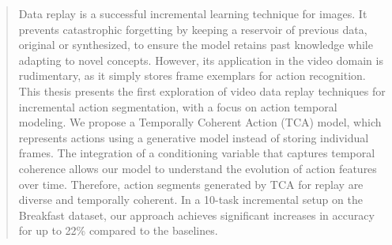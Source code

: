 \begin{abstract}

Data replay is a successful incremental learning technique for images. It prevents catastrophic forgetting by keeping a reservoir of previous data, original or synthesized, to ensure the model retains past knowledge while adapting to novel concepts. However, its application in the video domain is rudimentary, as it simply stores frame exemplars for action recognition. This thesis presents the first exploration of video data replay techniques for incremental action segmentation, with a focus on action temporal modeling. We propose a Temporally Coherent Action (TCA) model, which represents actions using a generative model instead of storing individual frames. The integration of a conditioning variable that captures temporal coherence allows our model to understand the evolution of action features over time. Therefore, action segments generated by TCA for replay are diverse and temporally coherent. In a 10-task incremental setup on the Breakfast dataset, our approach achieves significant increases in accuracy for up to 22\% compared to the baselines.

\end{abstract}
